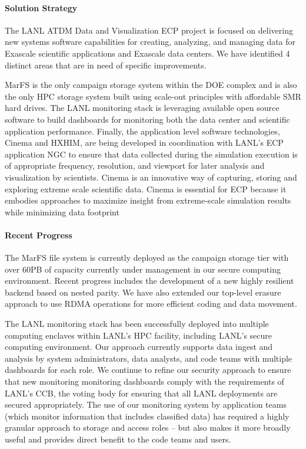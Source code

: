 \paragraph{Solution Strategy}
The LANL ATDM Data and Visualization ECP project is focused on delivering new
systems software capabilities for creating, analyzing, and managing data for
Exascale scientific applications and Exascale data centers. We have identified
4 distinct areas that are in need of specific improvements.

MarFS is the only campaign storage system within the DOE complex and is
also the only HPC storage system built using scale-out principles with affordable
SMR hard drives. The LANL monitoring stack is leveraging available open source
software to build dashboards for monitoring both the data center and
scientific application performance. Finally, the application level software
technologies, Cinema and HXHIM, are being developed in coordination with
LANL's ECP application NGC to ensure that data collected during the simulation
execution is of appropriate frequency, resolution, and viewport for later
analysis and visualization by scientists. Cinema is an innovative way of
capturing, storing and exploring extreme scale scientific data. Cinema is
essential for ECP because it embodies approaches to maximize insight from
extreme-scale simulation results while minimizing data footprint 

\paragraph{Recent Progress}
The MarFS file system is currently deployed as the campaign storage tier
with over 60PB of capacity currently under management in our secure computing
environment. Recent progress includes the development of a new highly
resilient backend based on nested parity. We have also extended our top-level
erasure approach to use RDMA operations for more efficient coding and data movement.

The LANL monitoring stack has been successfully deployed into multiple
computing enclaves within LANL's HPC facility, including LANL's secure
computing environment. Our approach currently supports data ingest and
analysis by system administrators, data analysts, and code teams with multiple
dashboards for each role. We continue to refine our security approach to
ensure that new monitoring monitoring dashboards comply with the requirements
of LANL's CCB, the voting body for ensuring that all LANL deployments are
secured appropriately. The use of our monitoring system by application teams
(which monitor information that includes classified data) has required a
highly granular approach to storage and access roles -- but also makes it more
broadly useful and provides direct benefit to the code teams and users.

